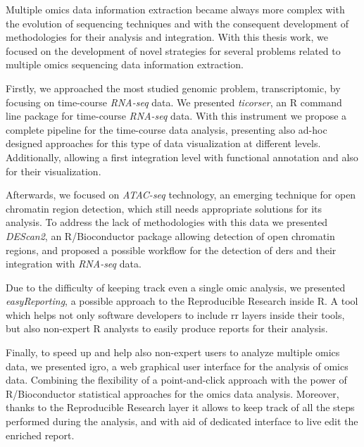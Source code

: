 Multiple omics data information extraction became always more complex with the evolution of sequencing techniques and with the consequent development of methodologies for their analysis and integration.
With this thesis work, we focused on the development of novel strategies for several problems related to multiple omics sequencing data information extraction.

Firstly, we approached the most studied genomic problem, transcriptomic, by focusing on time-course \textit{RNA-seq} data.
We presented \textit{ticorser}, an R command line package for time-course \textit{RNA-seq} data.
With this instrument we propose a complete pipeline for the time-course data analysis, presenting also ad-hoc designed approaches for this type of data visualization at different levels.
Additionally, allowing a first integration level with functional annotation and also for their visualization.

Afterwards, we focused on \textit{ATAC-seq} technology, an emerging technique for open chromatin region detection, which still needs appropriate solutions for its analysis.
To address the lack of methodologies with this data we presented \textit{DEScan2}, an R/Bioconductor package allowing detection of open chromatin regions, and proposed a possible workflow for the detection of \glspl{der} and their integration with \textit{RNA-seq} data.

Due to the difficulty of keeping track even a single omic analysis, we presented \textit{easyReporting}, a possible approach to the Reproducible Research inside R.
A tool which helps not only software developers to include \gls{rr} layers inside their tools, but also non-expert R analysts to easily produce reports for their analysis.

Finally, to speed up and help also non-expert users to analyze multiple omics data, we presented \gls{igro}, a web graphical user interface for the analysis of omics data.
Combining the flexibility of a point-and-click approach with the power of R/Bioconductor statistical approaches for the omics data analysis.
Moreover, thanks to the Reproducible Research layer it allows to keep track of all the steps performed during the analysis, and with aid of dedicated interface to live edit the enriched report.
